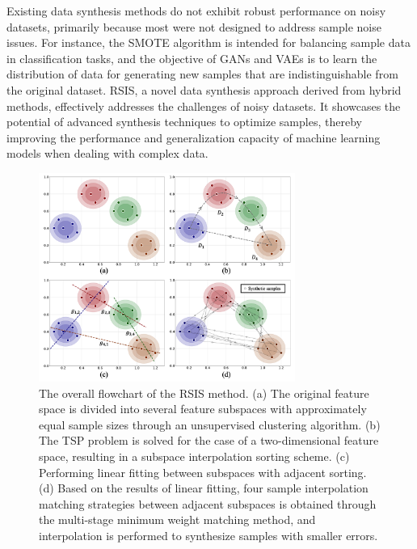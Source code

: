 \documentclass[lettersize,journal]{IEEEtran}
\begin{document}
Existing data synthesis methods do not exhibit robust performance 
on noisy datasets, primarily because most were not designed to 
address sample noise issues. For instance, the SMOTE algorithm is 
intended for balancing sample data in classification 
tasks, and the objective of GANs and VAEs is to learn 
the distribution of data for generating new samples that 
are indistinguishable from the original dataset. RSIS, a 
novel data synthesis approach derived 
from hybrid methods, effectively addresses the challenges of noisy 
datasets. It showcases the potential of advanced synthesis techniques 
to optimize samples, thereby improving the performance and 
generalization capacity of machine learning models when dealing 
with complex data.


\begin{figure}[!t]
  \centering
  \includegraphics[width=3.3in]{Fig1.png}
  \caption{The overall flowchart of the RSIS method. (a) The 
  original feature space is divided into several feature 
  subspaces with approximately equal sample sizes through an 
  unsupervised clustering algorithm. (b) The TSP problem is 
  solved for the case of a two-dimensional feature space, 
  resulting in a subspace interpolation sorting scheme. (c) 
  Performing linear fitting between subspaces with adjacent 
  sorting. (d) Based on the results of linear fitting, four 
  sample interpolation matching strategies between adjacent 
  subspaces is obtained through the multi-stage minimum weight 
  matching method, and interpolation is performed to 
  synthesize samples with smaller errors.}
  \label{Fig1}
\end{figure}
\end{document}
